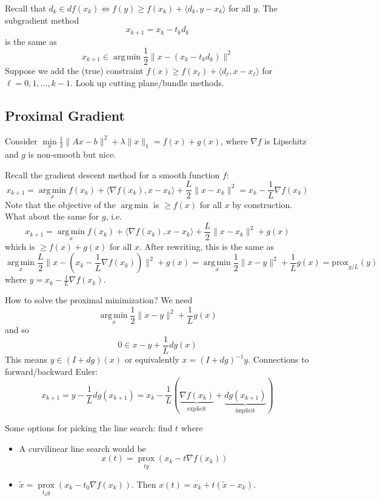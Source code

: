 \documentclass[english, 11pt]{article}
\DeclareMathOperator*{\argmin}{arg\,min}
\DeclareMathOperator*{\prox}{prox}
\begin{document}
\begin{rem}
Recall that $d_k \in d f(x_k) \iff f(y) \ge f(x_k) + \langle d_k, y-x_k \rangle$ for all $y$. The subgradient method \[
x_{k+1} = x_k - t_k d_k
\]  
is the same as 
\[
x_{k+1} \in \argmin \frac{1}{2} \|x - (x_k - t_k d_k) \|^2
\]  
Suppose we add the (true) constraint $f(x) \ge f(x_\ell) + \langle d_\ell,x-x_\ell \rangle$ for $\ell=0,1,\dots,k-1$. Look up cutting plane/bundle methods.
\end{rem}


\subsection{Proximal Gradient}
Consider $\min \limits_{x} \frac{1}{2} \|Ax-b\|^2 + \lambda \|x\|_1 = f(x) + g(x)$, where $\nabla f$ is Lipschitz and $g$ is non-smooth but nice. 

Recall the gradient descent method for a smooth function $f$:
\[
x_{k+1} = \argmin \limits_x f(x_k) + \langle \nabla f(x_k), x -x_k \rangle + \frac{L}{2} \|x-x_k\|^2 = x_k - \frac{1}{L} \nabla f(x_k)
\]
Note that the objective of the $\argmin$ is $\ge f(x)$ for all $x$ by construction. What about the same for $g$, i.e.\
\[
x_{k+1} = \argmin \limits_x f(x_k) + \langle \nabla f(x_k), x -x_k \rangle + \frac{L}{2} \|x-x_k\|^2 + g(x)
\]
which is $\ge f(x) + g(x)$ for all $x$. After rewriting, this is the same as
\[
\argmin \limits_x \frac{L}{2} \| x- (x_k - \frac{1}{L} \nabla f(x_k)) \|^2 + g(x)
= \argmin \limits_x \frac{1}{2} \|x-y\|^2 + \frac{1}{L} g(x)
= \text{prox}_{g/L}(y)
\]
where $y = x_k - \frac{1}{L} \nabla f(x_k)$.


\begin{rem}
How to solve the proximal minimization? We need
\[
\argmin \limits_x \frac{1}{2} \|x-y\|^2 + \frac{1}{L} g(x)
\]
and so
\[
0 \in x -y + \frac{1}{L} dg(x)
\]
This means $y \in (I + dg) (x)$ or equivalently $x = (I + dg)^{-1} y$. Connections to forward/backward Euler:
\[
x_{k+1} = y - \frac{1}{L} d g(x_{k+1}) = x_k - \frac{1}{L} \left( \underbrace{\nabla f(x_k)}_{\text{explicit}} + \underbrace{dg(x_{k+1})}_{\text{implicit}} \right)
\]
\end{rem}


\begin{rem}
Some options for picking the line search: find $t$ where 
\begin{itemize}
\item A curvilinear line search would be
\[
x(t) = \prox \limits_{t g} (x_k - t \nabla f(x_k) )
\]

\item $\tilde{x} = \prox \limits_{t_0 g} (x_k - t_0 \nabla f(x_k))$. Then $x(t) = x_k + t(\tilde x - x_k)$. 
\end{itemize}
\end{rem}
\end{document}
